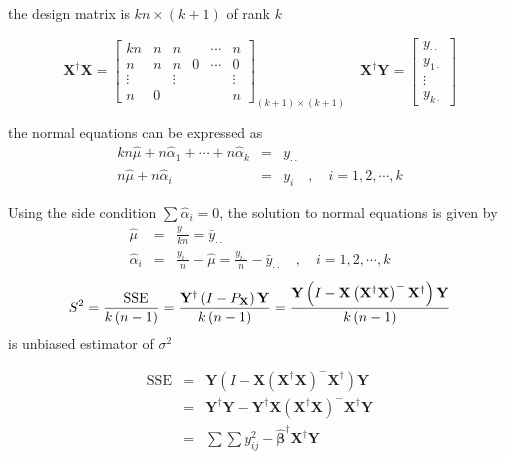 \documentclass{article}
\begin{document}
the design matrix is $kn\times \left( k+1\right) $ of rank $k$

\begin{equation*}
\mathbf{X}^{\dagger }\mathbf{X}=\left[ 
\begin{array}{cccccc}
kn & n & n &  & \cdots & n \\ 
n & n & n & 0 & \cdots & 0 \\ 
\vdots &  & \vdots &  &  & \vdots \\ 
n & 0 &  &  &  & n%
\end{array}%
\right] _{\left( k+1\right) \times \left( k+1\right) }\quad \mathbf{X}%
^{\dagger }\mathbf{Y}=\left[ 
\begin{array}{c}
y_{\cdot \cdot } \\ 
y_{1\cdot } \\ 
\vdots \\ 
y_{k\cdot }%
\end{array}%
\right]
\end{equation*}

\bigskip

the normal equations can be expressed as%
\begin{eqnarray*}
kn\hat{\mu}+n\hat{\alpha}_{1}+\cdots +n\hat{\alpha}_{k} &=&y_{\cdot \cdot }
\\
n\hat{\mu}+n\hat{\alpha}_{i} &=&y_{i}\quad ,\quad i=1,2,\cdots ,k
\end{eqnarray*}

Using the side condition $\sum \hat{\alpha}_{i}=0$, the solution to normal
equations is given by%
\begin{eqnarray*}
\hat{\mu} &=&\frac{y_{\cdot \cdot }}{kn}=\bar{y}_{\cdot \cdot } \\
\hat{\alpha}_{i} &=&\frac{y_{i\cdot }}{n}-\hat{\mu}=\frac{y_{i\cdot }}{n}-%
\bar{y}_{\cdot \cdot }\quad ,\quad i=1,2,\cdots ,k
\end{eqnarray*}%
\begin{equation*}
S^{2}=\frac{\text{SSE}}{k\left( n-1\right) }=\frac{\mathbf{Y}^{\dagger
}\left( I-P_{\mathbf{X}}\right) \mathbf{Y}}{k\left( n-1\right) }=\frac{%
\mathbf{Y}\left( I-\mathbf{X}\left( \mathbf{X}^{\dagger }\mathbf{X}\right)
^{-}\mathbf{X}^{\dagger }\right) \mathbf{Y}}{k\left( n-1\right) }
\end{equation*}%
is unbiased estimator of $\sigma ^{2}$

\bigskip

\begin{eqnarray*}
\text{SSE} &=&\mathbf{Y}\left( I-\mathbf{X}\left( \mathbf{X}^{\dagger }%
\mathbf{X}\right) ^{-}\mathbf{X}^{\dagger }\right) \mathbf{Y} \\
&=&\mathbf{Y}^{\dagger }\mathbf{Y-Y}^{\dagger }\mathbf{X}\left( \mathbf{X}%
^{\dagger }\mathbf{X}\right) ^{-}\mathbf{X}^{\dagger }\mathbf{Y} \\
&=&\sum \sum y_{ij}^{2}-\mathbf{\hat{\beta}}^{\dagger }\mathbf{X}^{\dagger }%
\mathbf{Y}
\end{eqnarray*}
\end{document}
